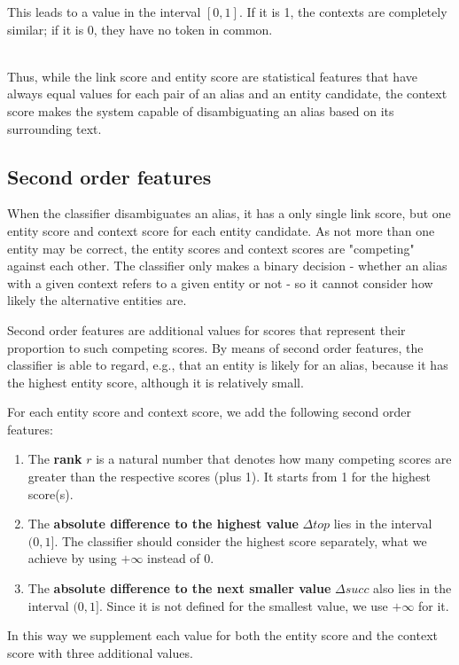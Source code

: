 This leads to a value in the interval $[0, 1]$. If it is 1, the contexts are completely similar; if it is 0, they have no token in common.

~\\
Thus, while the link score and entity score are statistical features that have always equal values for each pair of an alias and an entity candidate, the context score makes the system capable of disambiguating an alias based on its surrounding text.



\subsection{Second order features}
When the classifier disambiguates an alias, it has a only single link score, but one entity score and context score for each entity candidate. As not more than one entity may be correct, the entity scores and context scores are "competing" against each other. The classifier only makes a binary decision - whether an alias with a given context refers to a given entity or not - so it cannot consider how likely the alternative entities are.

Second order features are additional values for scores that represent their proportion to such competing scores. By means of second order features, the classifier is able to regard, e.g., that an entity is likely for an alias, because it has the highest entity score, although it is relatively small.

For each entity score and context score, we add the following second order features:

\begin{enumerate}
\item The \textbf{rank} $r$ is a natural number that denotes how many competing scores are greater than the respective scores (plus 1). It starts from 1 for the highest score(s).

\item The \textbf{absolute difference to the highest value} $\Delta top$ lies in the interval $(0, 1]$. The classifier should consider the highest score separately, what we achieve by using $+\infty$ instead of 0.

\item The \textbf{absolute difference to the next smaller value} $\Delta succ$ also lies in the interval $(0, 1]$. Since it is not defined for the smallest value, we use $+\infty$ for it.
\end{enumerate}

In this way we supplement each value for both the entity score and the context score with three additional values.